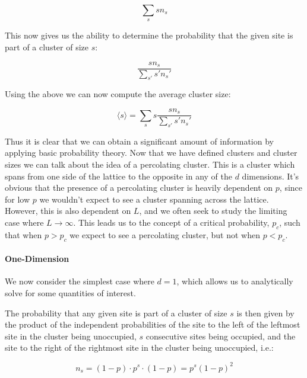 \begin{equation}
	\label{eqn:p_in_cluster}
	\sum_s s n_s
\end{equation}

This now gives us the ability to determine the probability that the given site is part of a cluster of size $s$:

\begin{equation}
	\label{eqn:p_in_cluster_size_s}
	\frac{s n_s}{\sum_{s'} s' n_s'}
\end{equation}

Using the above we can now compute the average cluster size:

\begin{equation}
	\label{eqn:avg_cluster_size}
	\langle s \rangle = \sum_s s \frac{s n_s}{\sum_{s'} s' n_s'}
\end{equation}

Thus it is clear that we can obtain a significant amount of information by applying basic probability theory.
Now that we have defined clusters and cluster sizes we can talk about the idea of a percolating cluster.
This is a cluster which spans from one side of the lattice to the opposite in any of the $d$ dimensions.
It's obvious that the presence of a percolating cluster is heavily dependent on $p$, since for low $p$ we wouldn't expect to see a cluster spanning across the lattice.
However, this is also dependent on $L$, and we often seek to study the limiting case where $L \rightarrow \infty$.
This leads us to the concept of a critical probability, $p_c$, such that when $p > p_c$ we expect to see a percolating cluster, but not when $p < p_c$.

\paragraph{One-Dimension}
We now consider the simplest case where $d = 1$, which allows us to analytically solve for some quantities of interest.


The probability that any given site is part of a cluster of size $s$ is then given by the product of the independent probabilities of the site to the left of the leftmost site in the cluster being unoccupied, $s$ consecutive sites being occupied, and the site to the right of the rightmost site in the cluster being unoccupied, i.e.:

\begin{equation}
	\label{eqn:n_s_1d}
	n_s = (1 - p) \cdot p^s \cdot (1 - p) = p^s (1 - p)^2
\end{equation}

